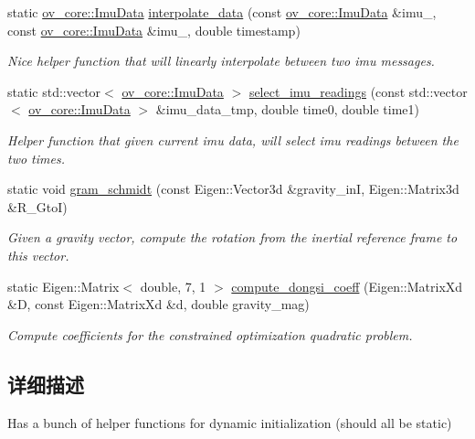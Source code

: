 \begin{DoxyCompactItemize}
\item 
static \hyperlink{structov__core_1_1ImuData}{ov\+\_\+core\+::\+Imu\+Data} \hyperlink{classov__init_1_1InitializerHelper_aa5c39a05a5c4328b02907012922fe4cf}{interpolate\+\_\+data} (const \hyperlink{structov__core_1_1ImuData}{ov\+\_\+core\+::\+Imu\+Data} \&imu\+\_, const \hyperlink{structov__core_1_1ImuData}{ov\+\_\+core\+::\+Imu\+Data} \&imu\+\_, double timestamp)
\begin{DoxyCompactList}\small\item\em Nice helper function that will linearly interpolate between two imu messages. \end{DoxyCompactList}\item 
static std\+::vector$<$ \hyperlink{structov__core_1_1ImuData}{ov\+\_\+core\+::\+Imu\+Data} $>$ \hyperlink{classov__init_1_1InitializerHelper_ad295c3818e37e9bf44c17515fca18003}{select\+\_\+imu\+\_\+readings} (const std\+::vector$<$ \hyperlink{structov__core_1_1ImuData}{ov\+\_\+core\+::\+Imu\+Data} $>$ \&imu\+\_\+data\+\_\+tmp, double time0, double time1)
\begin{DoxyCompactList}\small\item\em Helper function that given current imu data, will select imu readings between the two times. \end{DoxyCompactList}\item 
static void \hyperlink{classov__init_1_1InitializerHelper_a667b07d7092365ad12df893ae3904f6c}{gram\+\_\+schmidt} (const Eigen\+::\+Vector3d \&gravity\+\_\+inI, Eigen\+::\+Matrix3d \&R\+\_\+\+GtoI)
\begin{DoxyCompactList}\small\item\em Given a gravity vector, compute the rotation from the inertial reference frame to this vector. \end{DoxyCompactList}\item 
static Eigen\+::\+Matrix$<$ double, 7, 1 $>$ \hyperlink{classov__init_1_1InitializerHelper_acf91adc24386b43a62ff8d354bde0924}{compute\+\_\+dongsi\+\_\+coeff} (Eigen\+::\+Matrix\+Xd \&D, const Eigen\+::\+Matrix\+Xd \&d, double gravity\+\_\+mag)
\begin{DoxyCompactList}\small\item\em Compute coefficients for the constrained optimization quadratic problem. \end{DoxyCompactList}\end{DoxyCompactItemize}


\subsection{详细描述}
Has a bunch of helper functions for dynamic initialization (should all be static) 

